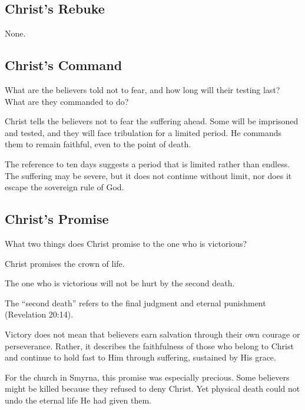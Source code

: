 \subsection{Christ's Rebuke}

None.

\subsection{Christ's Command}

\begin{ScriptureBox2}{What are the believers told not to fear, and how long will their testing last? What are they commanded to do?}
\item[2:10a] Christ tells the believers not to fear the suffering ahead. Some will be imprisoned and tested, and they will face tribulation for a limited period. He commands them to remain faithful, even to the point of death.
\end{ScriptureBox2}

The reference to ten days suggests a period that is limited rather than endless. The suffering may be severe, but it does not continue without limit, nor does it escape the sovereign rule of God.

\subsection{Christ's Promise}

\begin{ScriptureBox2}{What two things does Christ promise to the one who is victorious?}
\item[2:10b] Christ promises the crown of life.

\item[2:11] The one who is victorious will not be hurt by the second death.
\end{ScriptureBox2}

The ``second death'' refers to the final judgment and eternal punishment (Revelation 20:14).

Victory does not mean that believers earn salvation through their own courage or perseverance. Rather, it describes the faithfulness of those who belong to Christ and continue to hold fast to Him through suffering, sustained by His grace.

For the church in Smyrna, this promise was especially precious. Some believers might be killed because they refused to deny Christ. Yet physical death could not undo the eternal life He had given them.

